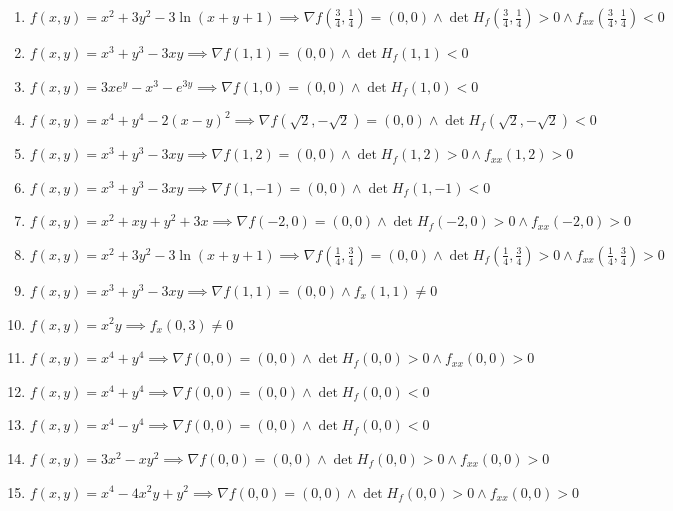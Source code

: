 \documentclass[11pt,a4paper]{article}
\begin{document}
\begin{enumerate}
\item $\displaystyle f(x, y) = x^{2} + 3y^{2} - 3\ln(x + y + 1) \implies \nabla f\left( \frac{3}{4}, \frac{1}{4} \right) = (0, 0) \land \det H_{f}\left( \frac{3}{4}, \frac{1}{4} \right) > 0 \land f_{xx}\left( \frac{3}{4}, \frac{1}{4} \right) < 0$
\item $\displaystyle f(x, y) = x^{3} + y^{3} - 3xy \implies \nabla f(1, 1) = (0, 0) \land \det H_{f}(1, 1) < 0$
\item $\displaystyle f(x, y) = 3x e^{y} - x^{3} - e^{3y} \implies \nabla f(1, 0) = (0, 0) \land \det H_{f}(1, 0) < 0$
\item $\displaystyle f(x, y) = x^{4} + y^{4} - 2(x - y)^{2} \implies \nabla f\left( \sqrt{2}, -\sqrt{2} \right) = (0, 0) \land \det H_{f}\left( \sqrt{2}, -\sqrt{2} \right) < 0$
\item $\displaystyle f(x, y) = x^{3} + y^{3} - 3xy \implies \nabla f(1, 2) = (0, 0) \land \det H_{f}(1, 2) > 0 \land f_{xx}(1, 2) > 0$
\item $\displaystyle f(x, y) = x^{3} + y^{3} - 3xy \implies \nabla f(1, -1) = (0, 0) \land \det H_{f}(1, -1) < 0$
\item $\displaystyle f(x, y) = x^{2} + xy + y^{2} + 3x \implies \nabla f(-2, 0) = (0, 0) \land \det H_{f}(-2, 0) > 0 \land f_{xx}(-2, 0) > 0$
\item $\displaystyle f(x, y) = x^{2} + 3y^{2} - 3\ln(x + y + 1) \implies \nabla f\left( \frac{1}{4}, \frac{3}{4} \right) = (0, 0) \land \det H_{f}\left( \frac{1}{4}, \frac{3}{4} \right) > 0 \land f_{xx}\left( \frac{1}{4}, \frac{3}{4} \right) > 0$
\item $\displaystyle f(x, y) = x^{3} + y^{3} - 3xy \implies \nabla f(1, 1) = (0, 0) \land f_{x}(1, 1) \neq 0$
\item $\displaystyle f(x, y) = x^{2} y \implies f_{x}(0, 3) \neq 0$
\item $\displaystyle f(x, y) = x^{4} + y^{4} \implies \nabla f(0, 0) = (0, 0) \land \det H_{f}(0, 0) > 0 \land f_{xx}(0, 0) > 0$
\item $\displaystyle f(x, y) = x^{4} + y^{4} \implies \nabla f(0, 0) = (0, 0) \land \det H_{f}(0, 0) < 0$
\item $\displaystyle f(x, y) = x^{4} - y^{4} \implies \nabla f(0, 0) = (0, 0) \land \det H_{f}(0, 0) < 0$
\item $\displaystyle f(x, y) = 3x^{2} - x y^{2} \implies \nabla f(0, 0) = (0, 0) \land \det H_{f}(0, 0) > 0 \land f_{xx}(0, 0) > 0$
\item $\displaystyle f(x, y) = x^{4} - 4x^{2} y + y^{2} \implies \nabla f(0, 0) = (0, 0) \land \det H_{f}(0, 0) > 0 \land f_{xx}(0, 0) > 0$

\end{enumerate}
\end{document}
